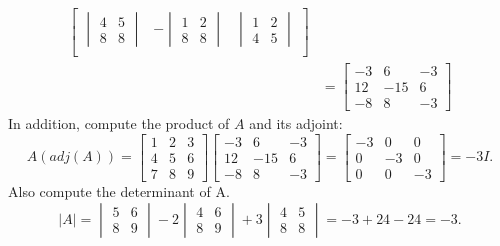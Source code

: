 \documentclass[../main.tex]{subfiles}
\begin{document}
\begin{example}
\begin{equation*}
\begin{aligned}
\begin{bmatrix}
          \begin{vmatrix}
            4 & 5\\
            8 & 8
          \end{vmatrix}
          &-\begin{vmatrix}
            1 & 2\\
            8 & 8
          \end{vmatrix}
          &\begin{vmatrix}
            1 & 2\\
            4 & 5
          \end{vmatrix}\\
      \end{bmatrix}\\
      &=\begin{bmatrix}
        -3 & 6 & -3\\
        12 & -15 & 6\\
        -8 & 8 & -3
      \end{bmatrix}
    \end{aligned}
  \end{equation*}
  In addition, compute the product of \(A\) and its adjoint:
  \begin{equation*}
    A(adj(A)) = \begin{bmatrix}
      1 & 2 & 3\\
      4 & 5 & 6\\
      7 & 8 & 9
    \end{bmatrix}
    \begin{bmatrix}
      -3 & 6 & -3\\
      12 & -15 & 6\\
      -8 & 8 & -3
    \end{bmatrix}
    =\begin{bmatrix}
      -3 & 0 & 0\\
      0 & -3 & 0\\
      0 & 0 & -3
    \end{bmatrix}
    =-3I.
  \end{equation*}
  Also compute the determinant of A.
  \begin{equation*}
    |A| = \begin{vmatrix}
      5 & 6\\
      8 & 9
    \end{vmatrix}
    -2\begin{vmatrix}
      4 & 6\\
      8 & 9
    \end{vmatrix}
    +3\begin{vmatrix}
      4 & 5\\
      8 & 8
    \end{vmatrix}
    = -3 +24 -24 = -3.
  \end{equation*}
\end{example}
\end{document}
